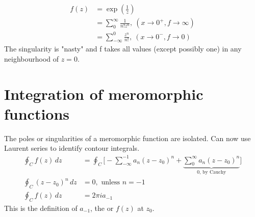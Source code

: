 \documentclass[a4paper, 11pt, normalem]{report}
\begin{document}
\begin{example}
    \begin{align}
        f(z) &= \exp\left(\frac{1}{z}\right) \\
             &= \sum_0^\infty \frac{1}{n!z^n},~ (x\to 0^+, f\to \infty) \\
             &= \sum_{-\infty}^0 \frac{z^n}{n!},~ (x\to 0^-, f\to 0)
    \end{align}
    The singularity is "nasty" and f takes all values (except possibly one) in any neighbourhood of $z=0$.
\end{example}

\section{Integration of meromorphic functions}
The poles or singularities of a meromorphic function are isolated.
Can now use Laurent series to identify contour integrals.
\begin{align}
    \oint_C f(z)\,dz &= \oint_C \Bigg[-\sum_{-\infty}^{-1} a_n(z-z_0)^n + \underbrace{\sum_0^\infty a_n(z-z_0)^n}_{0\text{, by Cauchy}}\Bigg] \\
    \oint_C (z-z_0)^n\,dz &= 0, \text{ unless } n = -1 \\
    \oint_C f(z)\,dz &= 2\pi i a_{-1}
\end{align}
This is the definition of $a_{-1}$, the  or $f(z)$ at $z_0$.
\end{document}
